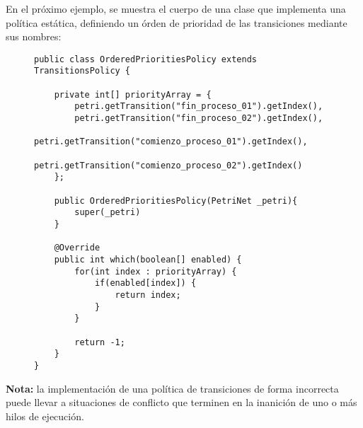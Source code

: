 En el próximo ejemplo, se muestra el cuerpo de una clase que implementa una
política estática, definiendo un órden de prioridad de las transiciones mediante sus
nombres:

\begin{figure}[H]
\centering
\begin{verbatim}
public class OrderedPrioritiesPolicy extends TransitionsPolicy {

    private int[] priorityArray = {
        petri.getTransition("fin_proceso_01").getIndex(),
        petri.getTransition("fin_proceso_02").getIndex(),
        petri.getTransition("comienzo_proceso_01").getIndex(),
        petri.getTransition("comienzo_proceso_02").getIndex()
    };

    public OrderedPrioritiesPolicy(PetriNet _petri){
        super(_petri)
    }
    
    @Override
    public int which(boolean[] enabled) {
        for(int index : priorityArray) {
            if(enabled[index]) {
                return index;
            }
        }
        
        return -1;
    }
}
\end{verbatim}
\end{figure}

\begin{framed}
\textbf{Nota:} la implementación de una política de transiciones de forma
incorrecta puede llevar a situaciones de conflicto que terminen en la inanición
de uno o más hilos de ejecución.
\end{framed}